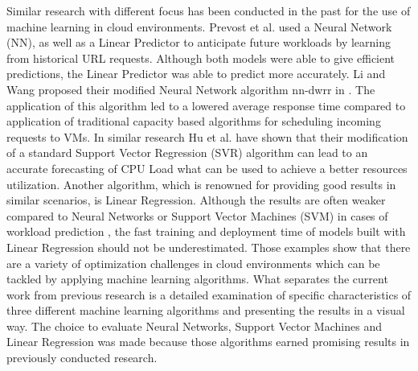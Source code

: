Similar research with different focus has been conducted in the past for the use of machine learning in cloud environments. Prevost et al. used a Neural Network (NN), as well as a Linear Predictor  \cite{prevost2011prediction} to anticipate future workloads by learning from historical URL requests. Although both models were able to give efficient predictions, the Linear Predictor was able to predict more accurately. Li and Wang proposed their modified Neural Network algorithm nn-dwrr in  \cite{li2014sla}. The application of this algorithm led to a lowered average response time compared to application of traditional capacity based algorithms for scheduling incoming requests to VMs. In similar research Hu et al.  \cite{hu2013kswsvr} have shown that their modification of a standard Support Vector Regression (SVR) algorithm can lead to an accurate forecasting of CPU Load what can be used to achieve a better resources utilization. Another algorithm, which is renowned for providing good results in similar scenarios, is Linear Regression. Although the results are often weaker compared to Neural Networks or Support Vector Machines (SVM) in cases of workload prediction  \cite{bankole2013predicting}  \cite{imam2011neural}, the fast training and deployment time of models built with Linear Regression should not be underestimated. Those examples show that there are a variety of optimization challenges in cloud environments which can be tackled by applying machine learning algorithms. What separates the current work from previous research is a detailed examination of specific characteristics of three different machine learning algorithms and presenting the results in a visual way. The choice to evaluate Neural Networks, Support Vector Machines and Linear Regression was made because those algorithms earned promising results in previously conducted research.


